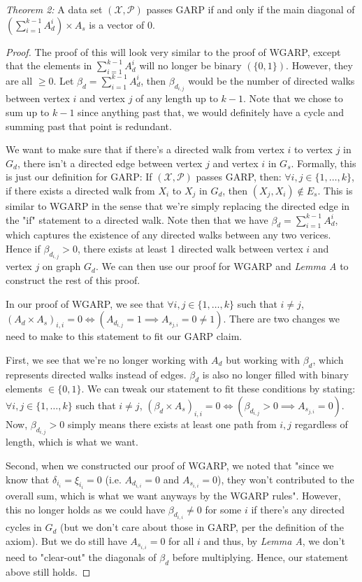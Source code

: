 \documentclass{article} %
\begin{document}
\textit{Theorem 2:} A data set $(\mathcal{X},\mathcal{P})$ passes GARP if and only if the main diagonal of $(\sum_{i=1}^{k-1}A_{d}^{i})\times A_s$ is a vector of 0.

\begin{proof}
The proof of this will look very similar to the proof of WGARP, except that the elements in $\sum_{i=1}^{k-1}A_{d}^{i}$ will no longer be binary $(\{0,1\})$. However, they are all $\geq0$. Let $\beta_d=\sum_{i=1}^{k-1}A_{d}^{i}$, then $\beta_{d_{i,j}}$ would be the number of directed walks between vertex $i$ and vertex $j$ of any length up to $k-1$. Note that we chose to sum up to $k-1$ since anything past that, we would definitely have a cycle and summing past that point is redundant.


We want to make sure that if there's a directed walk from vertex $i$ to vertex $j$ in $G_d$, there isn't a directed edge between vertex $j$ and vertex $i$ in $G_s$. Formally, this is just our definition for GARP: If $(\mathcal{X},\mathcal{P})$ passes GARP, then: $\forall i,j\in\{1,\dots,k\}$, if there exists a directed walk from $X_i$ to $X_j$ in $G_d$, then $(X_j,X_i)\not\in E_s$. This is similar to WGARP in the sense that we're simply replacing the directed edge in the "if" statement to a directed walk. Note then that we have $\beta_d=\sum_{i=1}^{k-1}A_{d}^{i}$, which captures the existence of any directed walks between any two verices. Hence if $\beta_{d_{i,j}}>0$, there exists at least 1 directed walk between vertex $i$ and vertex $j$ on graph $G_d$. We can then use our proof for WGARP and \textit{Lemma A} to construct the rest of this proof.


In our proof of WGARP, we see that $\forall i, j\in\{1,\ldots,k\}$ such that $i\not=j$, $(A_d\times A_s)_{i,i}=0 \iff (A_{d_{i,j}}=1 \implies A_{s_{j,i}}=0\not=1)$. There are two changes we need to make to this statement to fit our GARP claim. 

First, we see that we're no longer working with $A_d$ but working with $\beta_d$, which represents directed walks instead of edges. $\beta_d$ is also no longer filled with binary elements $\in\{0,1\}$. We can tweak our statement to fit these conditions by stating: $\forall i, j\in\{1,\ldots,k\}$ such that $i\not=j$, $(\beta_d\times A_s)_{i,i}=0 \iff (\beta_{d_{i,j}}>0 \implies A_{s_{j,i}}=0)$. Now, $\beta_{d_{i,j}}>0$ simply means there exists at least one path from $i,j$ regardless of length, which is what we want.

Second, when we constructed our proof of WGARP, we noted that "since we know that $\delta_{i_i}=\xi_{i_i}=0$ (i.e. $A_{d_{i,i}}=0$ and $A_{s_{i,i}}=0$), they won't contributed to the overall sum, which is what we want anyways by the WGARP rules". However, this no longer holds as we could have $\beta_{d_{i,i}}\not=0$ for some $i$ if there's any directed cycles in $G_d$ (but we don't care about those in GARP, per the definition of the axiom). But we do still have $A_{s_{i,i}}=0$ for all $i$ and thus, by \textit{Lemma A}, we don't need to "clear-out" the diagonals of $\beta_d$ before multiplying. Hence, our statement above still holds. 


\end{proof}
\end{document}

